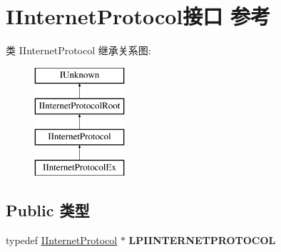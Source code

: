 \hypertarget{interface_i_internet_protocol}{}\section{I\+Internet\+Protocol接口 参考}
\label{interface_i_internet_protocol}
类 I\+Internet\+Protocol 继承关系图\+:\begin{figure}[H]
\begin{center}
\leavevmode
\includegraphics[height=4.000000cm]{interface_i_internet_protocol}
\end{center}
\end{figure}
\subsection*{Public 类型}
\begin{DoxyCompactItemize}
\item 
\mbox{\label{interface_i_internet_protocol_a32882cebdf70dc8a426e277705d4bf42}} 
typedef \hyperlink{interface_i_internet_protocol}{I\+Internet\+Protocol} $\ast$ {\bfseries L\+P\+I\+I\+N\+T\+E\+R\+N\+E\+T\+P\+R\+O\+T\+O\+C\+OL}
\end{DoxyCompactItemize}
